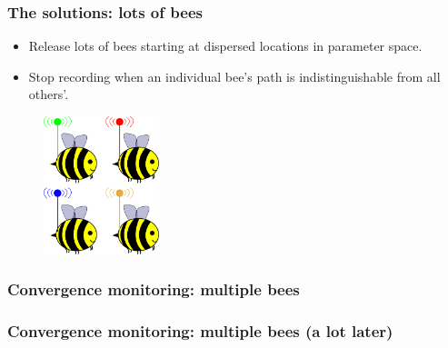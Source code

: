 \documentclass[handout]{beamer}
\begin{document}
\begin{frame}
\frametitle{The solutions: lots of bees}

\begin{itemize}
\item<2-> Release lots of bees starting at dispersed locations in parameter space.
\item<3-> Stop recording when an individual bee's path is indistinguishable from all others'.
\end{itemize}

\begin{figure}[ht]
\centerline{\includegraphics[width=0.3\textwidth]{animations_figures/lec4_bees.pdf}}
\end{figure}

\end{frame}

\begin{frame}
\frametitle{Convergence monitoring: multiple bees}

\begin{figure}[t]
\centerline{}
\end{figure}

\end{frame}

\begin{frame}
\frametitle{Convergence monitoring: multiple bees (a lot later)}

\begin{figure}[t]
\centerline{}
\end{figure}

\end{frame}
\end{document}
